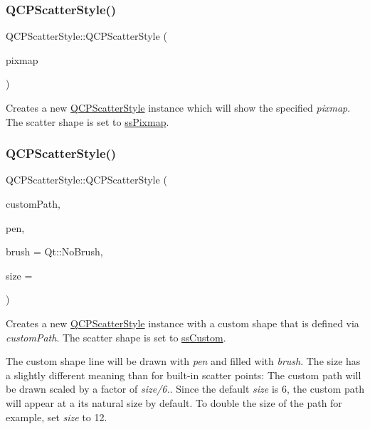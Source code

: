 \subsubsection{\texorpdfstring{Q\+C\+P\+Scatter\+Style()}{QCPScatterStyle()}\hspace{0.1cm}{\footnotesize\ttfamily [6/7]}}
{\footnotesize\ttfamily Q\+C\+P\+Scatter\+Style\+::\+Q\+C\+P\+Scatter\+Style (\begin{DoxyParamCaption}\item[{const Q\+Pixmap \&}]{pixmap }\end{DoxyParamCaption})}

Creates a new \hyperlink{class_q_c_p_scatter_style}{Q\+C\+P\+Scatter\+Style} instance which will show the specified {\itshape pixmap}. The scatter shape is set to \hyperlink{class_q_c_p_scatter_style_adb31525af6b680e6f1b7472e43859349a0e709ca8b00ac857a65459d63cc94521}{ss\+Pixmap}. \mbox{\label{class_q_c_p_scatter_style_a879c30647683b3cfbde2afecea815e6f}} 
\subsubsection{\texorpdfstring{Q\+C\+P\+Scatter\+Style()}{QCPScatterStyle()}\hspace{0.1cm}{\footnotesize\ttfamily [7/7]}}
{\footnotesize\ttfamily Q\+C\+P\+Scatter\+Style\+::\+Q\+C\+P\+Scatter\+Style (\begin{DoxyParamCaption}\item[{const Q\+Painter\+Path \&}]{custom\+Path,  }\item[{const Q\+Pen \&}]{pen,  }\item[{const Q\+Brush \&}]{brush = {\ttfamily Qt\+:\+:NoBrush},  }\item[{double}]{size = {} }\end{DoxyParamCaption})}

Creates a new \hyperlink{class_q_c_p_scatter_style}{Q\+C\+P\+Scatter\+Style} instance with a custom shape that is defined via {\itshape custom\+Path}. The scatter shape is set to \hyperlink{class_q_c_p_scatter_style_adb31525af6b680e6f1b7472e43859349a1c9c14e274bd8b10a9e0bb2a4c73f597}{ss\+Custom}.

The custom shape line will be drawn with {\itshape pen} and filled with {\itshape brush}. The size has a slightly different meaning than for built-\/in scatter points\+: The custom path will be drawn scaled by a factor of {\itshape size/6.}. Since the default {\itshape size} is 6, the custom path will appear at a its natural size by default. To double the size of the path for example, set {\itshape size} to 12. 


